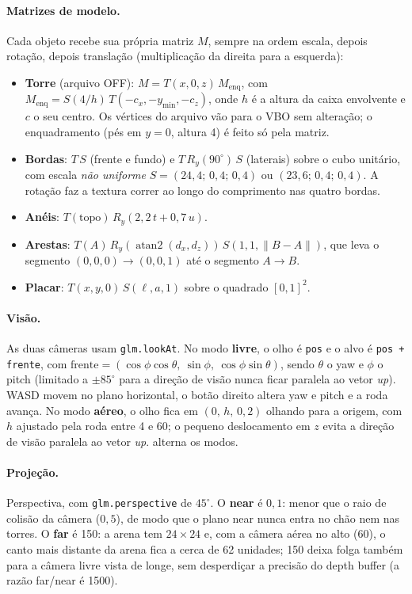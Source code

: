 \documentclass[a4paper,11pt]{article}
\newcommand{\tecla}[1]{\fbox{\footnotesize\ttfamily #1}}
\begin{document}
\paragraph{Matrizes de modelo.} Cada objeto recebe sua própria matriz
$M$, sempre na ordem escala, depois rotação, depois translação (multiplicação
da direita para a esquerda):
\begin{itemize}
\item \textbf{Torre} (arquivo OFF): $M = T(x,0,z)\,M_{\text{enq}}$, com
  $M_{\text{enq}} = S(4/h)\,T(-c_x,-y_{\min},-c_z)$, onde $h$ é a altura da caixa
  envolvente e $c$ o seu centro. Os vértices do arquivo vão para o VBO sem
  alteração; o enquadramento (pés em $y=0$, altura 4) é feito só pela matriz.
\item \textbf{Bordas}: $T\,S$ (frente e fundo) e $T\,R_y(90^\circ)\,S$ (laterais) sobre o cubo unitário, com escala \emph{não uniforme} $S=(24{,}4;\,0{,}4;\,0{,}4)$ ou $(23{,}6;\,0{,}4;\,0{,}4)$. A rotação faz a textura correr ao longo do comprimento nas quatro bordas.
\item \textbf{Anéis}: $T(\text{topo})\,R_y(2{,}2\,t + 0{,}7\,u)$.
\item \textbf{Arestas}: $T(A)\,R_y(\operatorname{atan2}(d_x,d_z))\,S(1,1,\lVert B-A\rVert)$,
  que leva o segmento $(0,0,0)\to(0,0,1)$ até o segmento $A\to B$.
\item \textbf{Placar}: $T(x,y,0)\,S(\ell,a,1)$ sobre o quadrado $[0,1]^2$.
\end{itemize}

\paragraph{Visão.} As duas câmeras usam \texttt{glm.lookAt}.
No modo \textbf{livre}, o olho é \texttt{pos} e o alvo é
\texttt{pos + frente}, com
$\text{frente} = (\cos\phi\cos\theta,\ \sin\phi,\ \cos\phi\sin\theta)$, sendo
$\theta$ o yaw e $\phi$ o pitch (limitado a $\pm85^\circ$ para a direção de
visão nunca ficar paralela ao vetor \emph{up}). WASD movem no plano horizontal,
o botão direito altera yaw e pitch e a roda avança. No modo \textbf{aéreo}, o
olho fica em $(0,\,h,\,0{,}2)$ olhando para a origem, com $h$ ajustado pela roda
entre 4 e 60; o pequeno deslocamento em $z$ evita a direção de visão paralela
ao vetor \emph{up}. \tecla{T} alterna os modos.

\paragraph{Projeção.} Perspectiva, com \texttt{glm.perspective} de
$45^\circ$. O \textbf{near} é $0{,}1$: menor que o raio de colisão da câmera
($0{,}5$), de modo que o plano near nunca entra no chão nem nas torres. O
\textbf{far} é 150: a arena tem $24\times24$ e, com a câmera aérea no alto
(60), o canto mais distante da arena fica a cerca de 62 unidades; 150 deixa
folga também para a câmera livre vista de longe, sem desperdiçar a precisão do
depth buffer (a razão far/near é 1500).
\end{document}
